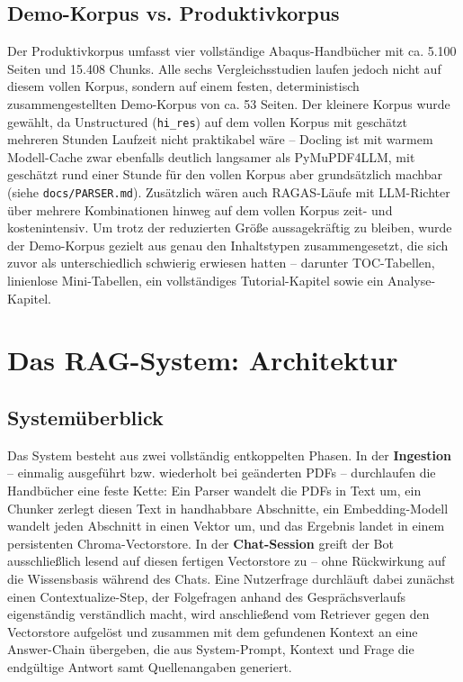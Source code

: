 \documentclass[11pt,a4paper]{article}
\begin{document}
\subsection{Demo-Korpus vs. Produktivkorpus}

Der Produktivkorpus umfasst vier vollständige Abaqus-Handbücher mit ca.
5.100 Seiten und 15.408 Chunks. Alle sechs Vergleichsstudien laufen jedoch
nicht auf diesem vollen Korpus, sondern auf einem festen, deterministisch
zusammengestellten Demo-Korpus von ca. 53 Seiten. Der kleinere Korpus wurde gewählt, da Unstructured (\texttt{hi\_res}) auf dem vollen
Korpus mit geschätzt mehreren Stunden Laufzeit nicht praktikabel wäre --
Docling ist mit warmem Modell-Cache zwar ebenfalls deutlich langsamer als
PyMuPDF4LLM, mit geschätzt rund einer Stunde für den vollen Korpus aber
grundsätzlich machbar (siehe \texttt{docs/PARSER.md}). Zusätzlich wären auch RAGAS-Läufe mit LLM-Richter über
mehrere Kombinationen hinweg auf dem vollen Korpus zeit- und
kostenintensiv. Um trotz der reduzierten Größe aussagekräftig zu bleiben,
wurde der Demo-Korpus gezielt aus genau den Inhaltstypen zusammengesetzt,
die sich zuvor als unterschiedlich schwierig erwiesen hatten -- darunter
TOC-Tabellen, linienlose Mini-Tabellen, ein vollständiges Tutorial-Kapitel
sowie ein Analyse-Kapitel.

\section{Das RAG-System: Architektur}
\label{sec:architektur}

\subsection{Systemüberblick}

Das System besteht aus zwei vollständig entkoppelten Phasen. In der
\textbf{Ingestion} -- einmalig ausgeführt bzw. wiederholt bei geänderten
PDFs -- durchlaufen die Handbücher eine feste Kette: Ein Parser wandelt die
PDFs in Text um, ein Chunker zerlegt diesen Text in handhabbare Abschnitte,
ein Embedding-Modell wandelt jeden Abschnitt in einen Vektor um, und das
Ergebnis landet in einem persistenten Chroma-Vectorstore. In der
\textbf{Chat-Session} greift der Bot ausschließlich lesend auf diesen fertigen
Vectorstore zu -- ohne Rückwirkung auf die Wissensbasis während des Chats.
Eine Nutzerfrage durchläuft dabei zunächst einen Contextualize-Step, der
Folgefragen anhand des Gesprächsverlaufs eigenständig verständlich macht,
wird anschließend vom Retriever gegen den Vectorstore aufgelöst und
zusammen mit dem gefundenen Kontext an eine Answer-Chain übergeben, die aus
System-Prompt, Kontext und Frage die endgültige Antwort samt
Quellenangaben generiert.
\end{document}
